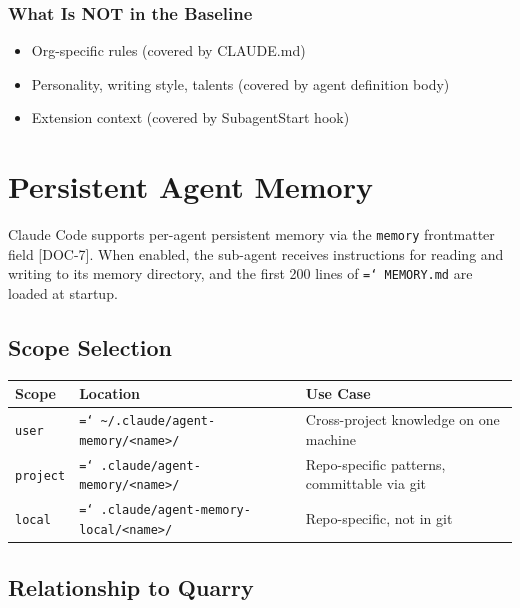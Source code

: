 \documentclass[a4paper,10pt]{article}
\newcommand{\fpath}[1]{\texttt{\hyphenchar\font=`\/ #1}}
\newcommand{\field}[1]{\texttt{#1}}
\newcommand{\coderef}[1]{\textsf{\small [#1]}}
\begin{document}
\subsubsection{What Is NOT in the Baseline}

\begin{itemize}
  \item Org-specific rules (covered by CLAUDE.md)
  \item Personality, writing style, talents (covered by agent
    definition body)
  \item Extension context (covered by SubagentStart hook)
\end{itemize}

\section{Persistent Agent Memory}
\label{sec:memory}

Claude Code supports per-agent persistent memory via the
\field{memory} frontmatter field \coderef{DOC-7}. When enabled, the
sub-agent receives instructions for reading and writing to its
memory directory, and the first 200 lines of \fpath{MEMORY.md} are
loaded at startup.

\subsection{Scope Selection}

\begin{center}
\begin{tabularx}{\textwidth}{@{}llX@{}}
\toprule
\textbf{Scope} & \textbf{Location} & \textbf{Use Case} \\
\midrule
\texttt{user} & \fpath{\~{}/.claude/agent-memory/<name>/} &
  Cross-project knowledge on one machine \\
\texttt{project} & \fpath{.claude/agent-memory/<name>/} &
  Repo-specific patterns, committable via git \\
\texttt{local} & \fpath{.claude/agent-memory-local/<name>/} &
  Repo-specific, not in git \\
\bottomrule
\end{tabularx}
\end{center}

\subsection{Relationship to Quarry}
\end{document}
